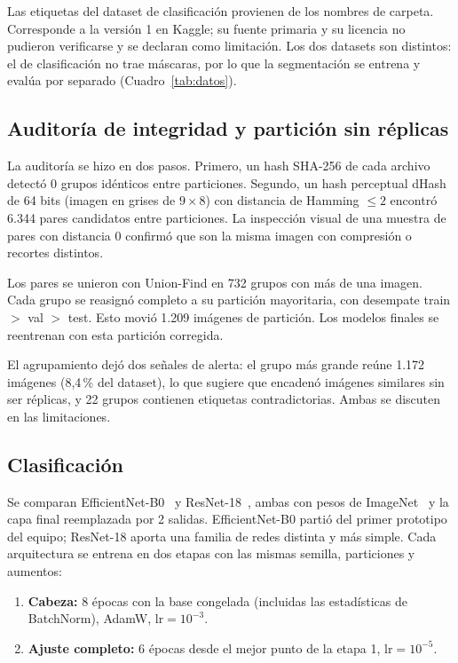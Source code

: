 \documentclass[conference]{IEEEtran}
\begin{document}
	Las etiquetas del dataset de clasificación provienen de los nombres de carpeta. Corresponde a la versión 1 en Kaggle; su fuente primaria y su licencia no pudieron verificarse y se declaran como limitación. Los dos datasets son distintos: el de clasificación no trae máscaras, por lo que la segmentación se entrena y evalúa por separado (Cuadro~\ref{tab:datos}).
	
	\subsection{Auditoría de integridad y partición sin réplicas}
	\label{sec:auditoria}
	
	La auditoría se hizo en dos pasos. Primero, un hash SHA-256 de cada archivo detectó 0 grupos idénticos entre particiones. Segundo, un hash perceptual dHash de 64 bits (imagen en grises de $9\times8$) con distancia de Hamming $\leq 2$ encontró 6.344 pares candidatos entre particiones. La inspección visual de una muestra de pares con distancia 0 confirmó que son la misma imagen con compresión o recortes distintos.
	
	Los pares se unieron con Union-Find en 732 grupos con más de una imagen. Cada grupo se reasignó completo a su partición mayoritaria, con desempate train $>$ val $>$ test. Esto movió 1.209 imágenes de partición. Los modelos finales se reentrenan con esta partición corregida.
	
	El agrupamiento dejó dos señales de alerta: el grupo más grande reúne 1.172 imágenes (8,4\,\% del dataset), lo que sugiere que encadenó imágenes similares sin ser réplicas, y 22 grupos contienen etiquetas contradictorias. Ambas se discuten en las limitaciones.
	
	\subsection{Clasificación}
	
	Se comparan EfficientNet-B0~\cite{tan2019} y ResNet-18~\cite{he2016}, ambas con pesos de ImageNet~\cite{russakovsky2015} y la capa final reemplazada por 2 salidas. EfficientNet-B0 partió del primer prototipo del equipo; ResNet-18 aporta una familia de redes distinta y más simple. Cada arquitectura se entrena en dos etapas con las mismas semilla, particiones y aumentos:
	
	\begin{enumerate}
		\item \textbf{Cabeza:} 8 épocas con la base congelada (incluidas las estadísticas de BatchNorm), AdamW, $\mathrm{lr} = 10^{-3}$.
		\item \textbf{Ajuste completo:} 6 épocas desde el mejor punto de la etapa 1, $\mathrm{lr} = 10^{-5}$.
	\end{enumerate}
	
\end{document}
